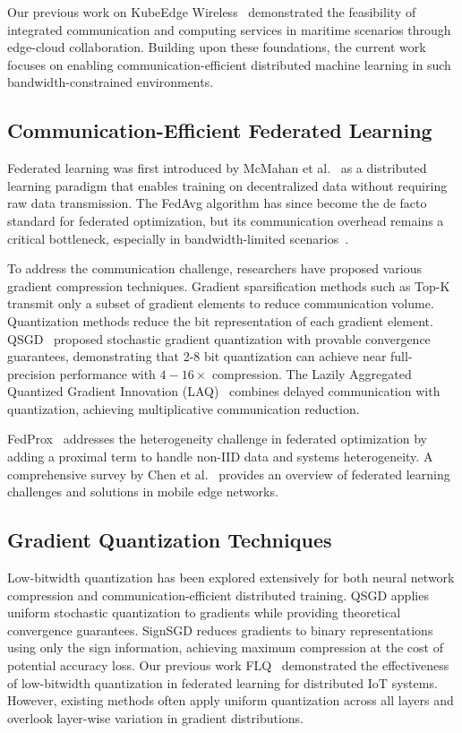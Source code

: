 \documentclass[journal]{IEEEtran}
\begin{document}
Our previous work on KubeEdge Wireless~\cite{kubeedge_anywhere} demonstrated the feasibility of integrated communication and computing services in maritime scenarios through edge-cloud collaboration. Building upon these foundations, the current work focuses on enabling communication-efficient distributed machine learning in such bandwidth-constrained environments.

\subsection{Communication-Efficient Federated Learning}
Federated learning was first introduced by McMahan et al.~\cite{mcmahan2017fedavg} as a distributed learning paradigm that enables training on decentralized data without requiring raw data transmission. The FedAvg algorithm has since become the de facto standard for federated optimization, but its communication overhead remains a critical bottleneck, especially in bandwidth-limited scenarios~\cite{kairouz2021fl}.

To address the communication challenge, researchers have proposed various gradient compression techniques. Gradient sparsification methods such as Top-K~\cite{5} transmit only a subset of gradient elements to reduce communication volume. Quantization methods reduce the bit representation of each gradient element. QSGD~\cite{QSGD} proposed stochastic gradient quantization with provable convergence guarantees, demonstrating that 2-8 bit quantization can achieve near full-precision performance with $4{-}16\times$ compression. The Lazily Aggregated Quantized Gradient Innovation (LAQ)~\cite{lazy_aggragation} combines delayed communication with quantization, achieving multiplicative communication reduction.

FedProx~\cite{li2020fedprox} addresses the heterogeneity challenge in federated optimization by adding a proximal term to handle non-IID data and systems heterogeneity. A comprehensive survey by Chen et al.~\cite{chen2020flsurvey} provides an overview of federated learning challenges and solutions in mobile edge networks.

\subsection{Gradient Quantization Techniques}
Low-bitwidth quantization has been explored extensively for both neural network compression and communication-efficient distributed training. QSGD applies uniform stochastic quantization to gradients while providing theoretical convergence guarantees. SignSGD reduces gradients to binary representations using only the sign information, achieving maximum compression at the cost of potential accuracy loss. Our previous work FLQ~\cite{FLQ} demonstrated the effectiveness of low-bitwidth quantization in federated learning for distributed IoT systems. However, existing methods often apply uniform quantization across all layers and overlook layer-wise variation in gradient distributions.
\end{document}
